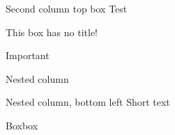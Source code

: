 \documentclass[a3,2col]{commsysposter}
\begin{document}
\begin{postercolumn}[0.7]
	\begin{posterbox}[postergreen]{Second column top box}
		Test
	\end{posterbox}
	\begin{posterbox}{}
		This box has no title!
	\end{posterbox}
	\begin{posterbox}[posterpurple]{Important}
		\lipsum[3]
	\end{posterbox}
	\begin{posterarea}[2][][0.6]
		\begin{postercolumn}[0.4]
			\begin{posterbox}[posterblue]{Nested column}
				\lipsum[4-5]
			\end{posterbox}
			\begin{posterbox}[posterorange]{}
			\end{posterbox}
			\begin{posterbox}[posteryellow]{Nested column, bottom left}
				Short text
			\end{posterbox}
		\end{postercolumn}
		\begin{postercolumn}[0.6]
			\begin{posterbox}[postergreen]{Boxbox}
				\lipsum[5]
			\end{posterbox}

\end{postercolumn}
\end{posterarea}
\end{postercolumn}
\end{document}
